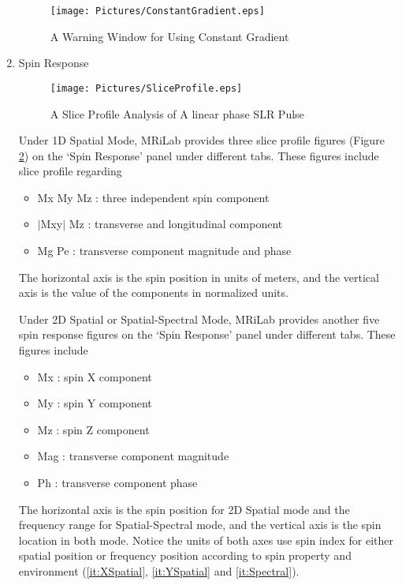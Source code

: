 \documentclass{book}%
\begin{document}
\begin{enumerate}
\begin{itemize}
\end{itemize}

	\begin{figure}[htbp]
	\centering
		\texttt{[image: Pictures/ConstantGradient.eps]}
	\caption{A Warning Window for Using Constant Gradient}
	\label{fig:ConstantGradient}
\end{figure}

	\item Spin Response \\

\begin{figure}[htbp]
	\centering
		\texttt{[image: Pictures/SliceProfile.eps]}
	\caption{A Slice Profile Analysis of A linear phase SLR Pulse}
	\label{fig:SliceProfile}
\end{figure}

Under 1D Spatial Mode, MRiLab provides three slice profile figures (Figure \ref{fig:SliceProfile}) on the `Spin Response' panel under different tabs. These figures include slice profile regarding 

\begin{itemize}
	\item Mx My Mz : three independent spin component
	\item $\vert$Mxy$\vert$ Mz : transverse and longitudinal component
	\item Mg Pe : transverse component magnitude and phase
\end{itemize}

The horizontal axis is the spin position in units of meters, and the vertical axis is the value of the components in normalized units. 

Under 2D Spatial or Spatial-Spectral Mode, MRiLab provides another five spin response figures on the `Spin Response' panel under different tabs. These figures include

\begin{itemize}
	\item Mx : spin X component
	\item My : spin Y component
	\item Mz : spin Z component
	\item Mag : transverse component magnitude
	\item Ph : transverse component phase
\end{itemize}

The horizontal axis is the spin position for 2D Spatial mode and the frequency range for Spatial-Spectral mode, and the vertical axis is the spin location in both mode. Notice the units of both axes use spin index for either spatial position or frequency position according to spin property and environment (\ref{it:XSpatial}, \ref{it:YSpatial} and \ref{it:Spectral}). 


\end{enumerate}
\end{document}
